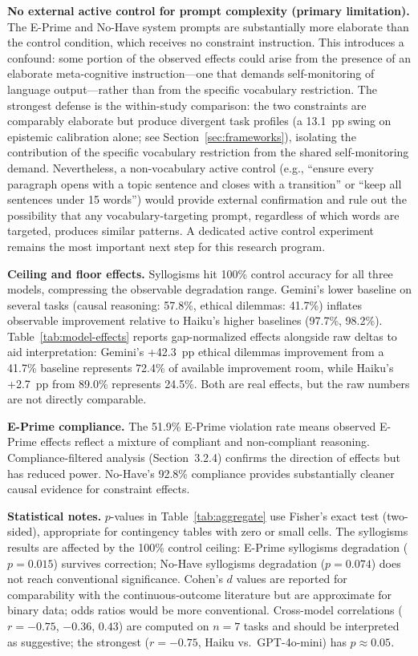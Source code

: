 \documentclass[11pt,a4paper]{article}
\begin{document}
\textbf{No external active control for prompt complexity (primary limitation).} The E-Prime and No-Have system prompts are substantially more elaborate than the control condition, which receives no constraint instruction. This introduces a confound: some portion of the observed effects could arise from the presence of an elaborate meta-cognitive instruction---one that demands self-monitoring of language output---rather than from the specific vocabulary restriction. The strongest defense is the within-study comparison: the two constraints are comparably elaborate but produce divergent task profiles (a 13.1~pp swing on epistemic calibration alone; see Section~\ref{sec:frameworks}), isolating the contribution of the specific vocabulary restriction from the shared self-monitoring demand. Nevertheless, a non-vocabulary active control (e.g., ``ensure every paragraph opens with a topic sentence and closes with a transition'' or ``keep all sentences under 15 words'') would provide external confirmation and rule out the possibility that any vocabulary-targeting prompt, regardless of which words are targeted, produces similar patterns. A dedicated active control experiment remains the most important next step for this research program.

\textbf{Ceiling and floor effects.} Syllogisms hit 100\% control accuracy for all three models, compressing the observable degradation range. Gemini's lower baseline on several tasks (causal reasoning: 57.8\%, ethical dilemmas: 41.7\%) inflates observable improvement relative to Haiku's higher baselines (97.7\%, 98.2\%). Table~\ref{tab:model-effects} reports gap-normalized effects alongside raw deltas to aid interpretation: Gemini's +42.3~pp ethical dilemmas improvement from a 41.7\% baseline represents 72.4\% of available improvement room, while Haiku's +2.7~pp from 89.0\% represents 24.5\%. Both are real effects, but the raw numbers are not directly comparable.

\textbf{E-Prime compliance.} The 51.9\% E-Prime violation rate means observed E-Prime effects reflect a mixture of compliant and non-compliant reasoning. Compliance-filtered analysis (Section~3.2.4) confirms the direction of effects but has reduced power. No-Have's 92.8\% compliance provides substantially cleaner causal evidence for constraint effects.

\textbf{Statistical notes.} $p$-values in Table~\ref{tab:aggregate} use Fisher's exact test (two-sided), appropriate for contingency tables with zero or small cells. The syllogisms results are affected by the 100\% control ceiling: E-Prime syllogisms degradation ($p = 0.015$) survives correction; No-Have syllogisms degradation ($p = 0.074$) does not reach conventional significance. Cohen's $d$ values are reported for comparability with the continuous-outcome literature but are approximate for binary data; odds ratios would be more conventional. Cross-model correlations ($r = -0.75$, $-0.36$, $0.43$) are computed on $n = 7$ tasks and should be interpreted as suggestive; the strongest ($r = -0.75$, Haiku vs.\ GPT-4o-mini) has $p \approx 0.05$.
\end{document}
